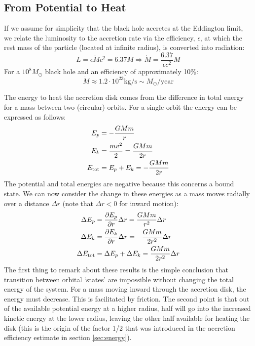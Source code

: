 \documentclass[11pt]{article}
\begin{document}
\subsection{From Potential to Heat}
If we assume for simplicity that the black hole accretes at the Eddington limit, we relate the luminosity to the accretion rate via the efficiency, $\epsilon$, at which the rest mass of the particle (located at infinite radius), is converted into radiation:
\begin{equation}
	L = \epsilon \dot{M} c^{2} = 6.37 M \Rightarrow \dot{M} = \frac{6.37}{\epsilon c^2}M
	\label{eq:mdot}
\end{equation}
For a $10^8 M_{\odot}$ black hole and an efficiency of approximately 10\%: $$\dot{M} \approx 1.2\cdot10^{23} \mathrm{kg/s} \sim M_{\odot}/\mathrm{year}$$

\noindent
The energy to heat the accretion disk comes from the difference in total energy for a mass between two (circular) orbits. For a single orbit the energy can be expressed as follows:
\begin{subequations}
	\begin{align}
		E_p &= -\frac{GMm}{r}\\
		E_k &= \frac{mv^2}{2} = \frac{GMm}{2r}\\
		E_{\rm tot} &= E_p + E_k = -\frac{GMm}{2r}
	\end{align}
\end{subequations}
The potential and total energies are negative because this concerns a bound state. We can now consider the change in these energies as a mass moves radially over a distance $\Delta r$ (note that $\Delta r<0$ for inward motion):
\begin{subequations}
	\begin{align}
		\Delta E_p &= \frac{\partial E_p}{\partial r} \Delta r = \frac{GMm}{r^2} \Delta r\\
		\Delta E_k &= \frac{\partial E_k}{\partial r} \Delta r = -\frac{GMm}{2r^2}\Delta r\\
		\Delta E_{\rm tot} &= \Delta E_p + \Delta E_k = \frac{GMm}{2r^2} \Delta r
	\end{align}
	\label{eq:DelE}
\end{subequations}
The first thing to remark about these results is the simple conclusion that transition between orbital `states' are impossible without changing the total energy of the system. For a mass moving inward through the accretion disk, the energy must decrease. This is facilitated by friction. The second point is that out of the available potential energy at a higher radius, half will go into the increased kinetic energy at the lower radius, leaving the other half available for heating the disk (this is the origin of the factor 1/2 that was introduced in the accretion efficiency estimate in section \ref{sec:energy}).\\
\end{document}
